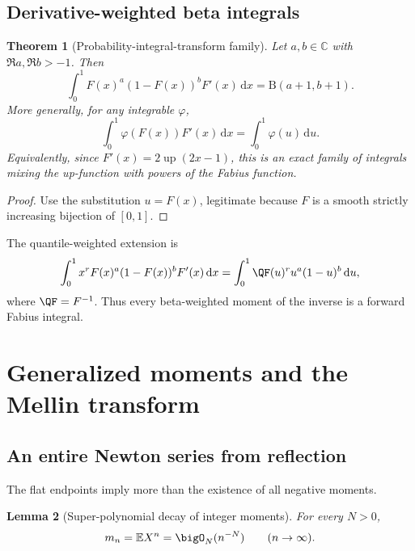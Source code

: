 \documentclass[11pt,oneside]{article}
\newtheorem{theorem}{Theorem}[section]
\newtheorem{lemma}[theorem]{Lemma}
\theoremstyle{definition}
\theoremstyle{remark}
\newcommand{\Up}{\operatorname{up}}
\newcommand{\E}{\mathbb E}
\newcommand{\C}{\mathbb C}
\newcommand{\dd}{\,\mathrm d}
\newcommand{\1}{\mathbf 1}
\begin{document}
\subsection{Derivative-weighted beta integrals}

\begin{theorem}[Probability-integral-transform family]
\label{p8:thm:beta-family}
Let \(a,b\in\C\) with \(\Re a,\Re b>-1\).  Then
\begin{equation}
 \boxed{\int_0^1 F(x)^a(1-F(x))^bF'(x)\dd x
 =\mathrm B(a+1,b+1).}
 \label{p8:eq:F-beta}
\end{equation}
More generally, for any integrable \(\varphi\),
\begin{equation}
 \int_0^1\varphi(F(x))F'(x)\dd x=\int_0^1\varphi(u)\dd u.
 \label{p8:eq:PIT}
\end{equation}
Equivalently, since \(F'(x)=2\Up(2x-1)\), this is an exact family of integrals
mixing the up-function with powers of the Fabius function.  \statusprovedPartll
\end{theorem}

\begin{proof}
Use the substitution \(u=F(x)\), legitimate because \(F\) is a smooth strictly
increasing bijection of \([0,1]\).
\end{proof}

The quantile-weighted extension is
\begin{equation}
 \int_0^1x^rF(x)^a(1-F(x))^bF'(x)\dd x
 =\int_0^1\QF(u)^r u^a(1-u)^b\dd u,
 \label{p8:eq:weighted-beta-quantile}
\end{equation}
where \(\QF=F^{-1}\).  Thus every beta-weighted moment of the inverse is a
forward Fabius integral.

\section{Generalized moments and the Mellin transform}
\label{p8:sec:mellin}

\subsection{An entire Newton series from reflection}

The flat endpoints imply more than the existence of all negative moments.

\begin{lemma}[Super-polynomial decay of integer moments]
\label{p8:lem:moment-decay}
For every \(N>0\),
\begin{equation}
 m_n=\E X^n=\bigO_N(n^{-N})\qquad(n\to\infty).
 \label{p8:eq:moment-superpoly}
\end{equation}
\statusprovedPartll
\end{lemma}
\end{document}
